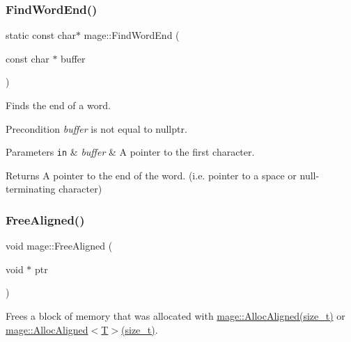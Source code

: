 \hypertarget{namespacemage_a81ebde51f9da00dd6fad364a2c5017cb}{}\label{namespacemage_a81ebde51f9da00dd6fad364a2c5017cb} 
\subsubsection{\texorpdfstring{Find\+Word\+End()}{FindWordEnd()}}
{\footnotesize\ttfamily static const char$\ast$ mage\+::\+Find\+Word\+End (\begin{DoxyParamCaption}\item[{const char $\ast$}]{buffer }\end{DoxyParamCaption})\hspace{0.3cm}{\ttfamily [static]}}

Finds the end of a word.

\begin{DoxyPrecond}{Precondition}
{\itshape buffer} is not equal to {\ttfamily nullptr}. 
\end{DoxyPrecond}

\begin{DoxyParams}[1]{Parameters}
\mbox{\tt in}  & {\em buffer} & A pointer to the first character. \\
\hline
\end{DoxyParams}
\begin{DoxyReturn}{Returns}
A pointer to the end of the word. (i.\+e. pointer to a space or null-\/terminating character) 
\end{DoxyReturn}
\hypertarget{namespacemage_a401c54df21447c491c527735647b5f80}{}\label{namespacemage_a401c54df21447c491c527735647b5f80} 
\subsubsection{\texorpdfstring{Free\+Aligned()}{FreeAligned()}}
{\footnotesize\ttfamily void mage\+::\+Free\+Aligned (\begin{DoxyParamCaption}\item[{void $\ast$}]{ptr }\end{DoxyParamCaption})}

Frees a block of memory that was allocated with \hyperlink{namespacemage_a8facb28d3867eefd618db6c859d349d5}{mage\+::\+Alloc\+Aligned(size\+\_\+t)} or \hyperlink{namespacemage_a8facb28d3867eefd618db6c859d349d5}{mage\+::\+Alloc\+Aligned$<$\+T$>$(size\+\_\+t)}.


